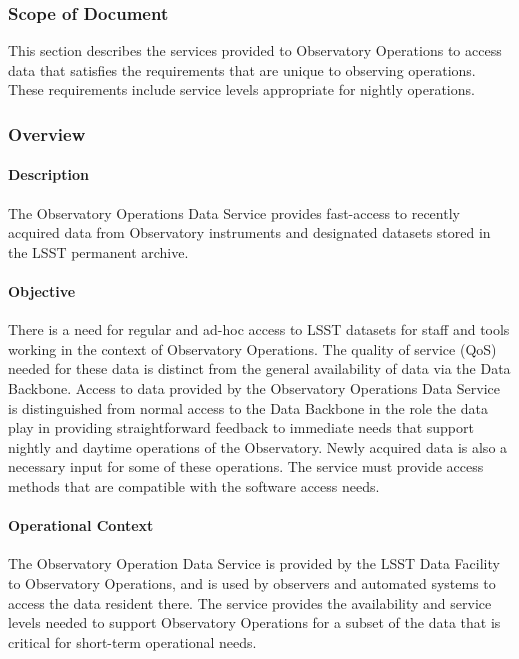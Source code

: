 \subsubsection{Scope of Document}
This section describes the services provided to Observatory
Operations to access data that satisfies the requirements that
are unique to observing operations. These requirements include
service levels appropriate for nightly operations.

\subsubsection{Overview}

\paragraph{Description}

The Observatory Operations Data Service provides fast-access to
recently acquired data from Observatory instruments and designated
datasets stored in the LSST permanent archive.

\paragraph{Objective}

There is a need for regular and ad-hoc access to LSST datasets for
staff and tools working in the context of Observatory Operations. The
quality of service (QoS) needed for these data is distinct from the general
availability of data via the Data Backbone. Access to data provided by the
Observatory Operations Data Service is distinguished from normal access
to the Data Backbone in the role the data play in providing straightforward
feedback to immediate needs that support nightly and daytime operations of
the Observatory. Newly acquired data is also a necessary input for some of
these operations. The service must provide access methods that are compatible
with the software access needs.

\paragraph{Operational Context}

The Observatory Operation Data Service is provided by the LSST Data
Facility to Observatory Operations, and is used by observers and
automated systems to access the data resident there. The service
provides the availability and service levels needed to support
Observatory Operations for a subset of the data that is critical for
short-term operational needs.

